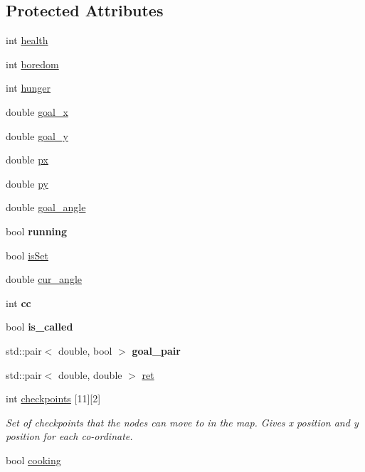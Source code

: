\subsection*{Protected Attributes}
\begin{DoxyCompactItemize}
\item 
int \hyperlink{classAssistant_a13877ed73a684f59171c686186110870}{health}
\item 
int \hyperlink{classAssistant_a1f237fcda74950177c10cc26ea778863}{boredom}
\item 
int \hyperlink{classAssistant_ad109fd18cc762f9b9f7e64b626ec5d48}{hunger}
\item 
double \hyperlink{classAssistant_a1a1f1fe48d0eb6a6a39b7fbdb2ef6641}{goal\-\_\-x}
\item 
double \hyperlink{classAssistant_a1b6ce5d7c3124140be8d351c847fe91c}{goal\-\_\-y}
\item 
double \hyperlink{classAssistant_a694fdaa5fb378340c42b7f75716cd1ce}{px}
\item 
double \hyperlink{classAssistant_ae092b444c226b5ffbdf454ad24f630d6}{py}
\item 
double \hyperlink{classAssistant_ae4468e02db193f0ffa0ca17a249f802d}{goal\-\_\-angle}
\item 
\hypertarget{classAssistant_a23a1a8275bd6637f9d51e64fc77541d9}{bool {\bfseries running}}\label{classAssistant_a23a1a8275bd6637f9d51e64fc77541d9}

\item 
bool \hyperlink{classAssistant_a939484adfb9673d2608282124ef348b9}{is\-Set}
\item 
double \hyperlink{classAssistant_a451a20f551c43d0b6810c8208fe84773}{cur\-\_\-angle}
\item 
\hypertarget{classAssistant_a6ab1f06230072f8b32d6a0a7c8421f6e}{int {\bfseries cc}}\label{classAssistant_a6ab1f06230072f8b32d6a0a7c8421f6e}

\item 
\hypertarget{classAssistant_af2f914caf84e27c9e14fdb2367ef9efe}{bool {\bfseries is\-\_\-called}}\label{classAssistant_af2f914caf84e27c9e14fdb2367ef9efe}

\item 
\hypertarget{classAssistant_ab02623d3ac8868e28de116fe0b00f509}{std\-::pair$<$ double, bool $>$ {\bfseries goal\-\_\-pair}}\label{classAssistant_ab02623d3ac8868e28de116fe0b00f509}

\item 
std\-::pair$<$ double, double $>$ \hyperlink{classAssistant_a741527493a17d0f6dc512c03a2055fc1}{ret}
\item 
int \hyperlink{classAssistant_a31e94c37f8c6509b81c5c92ad5213e3f}{checkpoints} \mbox{[}11\mbox{]}\mbox{[}2\mbox{]}
\begin{DoxyCompactList}\small\item\em Set of checkpoints that the nodes can move to in the map. Gives x position and y position for each co-\/ordinate. \end{DoxyCompactList}\item 
bool \hyperlink{classAssistant_af9a992d4b1c5036ed73c57c7e1c5c258}{cooking}
\end{DoxyCompactItemize}

